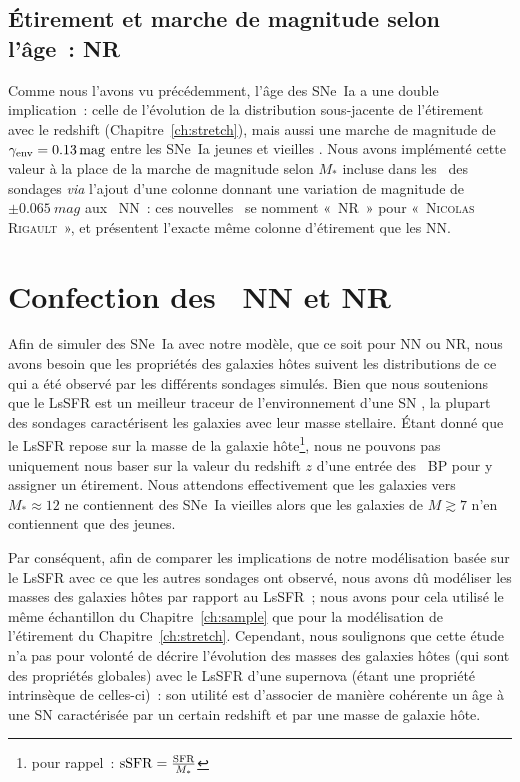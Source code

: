 \documentclass[../main/main.tex]{subfiles}
\begin{document}
\subsection{Étirement et marche de magnitude selon l'âge~: NR}\label{ssec:nr}

Comme nous l'avons vu précédemment, l'âge des SNe~Ia a une double implication~:
celle de l'évolution de la distribution sous-jacente de l'étirement avec le
redshift (Chapitre~\ref{ch:stretch}), mais aussi une marche de magnitude de
$\gamma_{\rm env} = \SI{0,13}{mag}$ entre les SNe~Ia jeunes et vieilles
\citep[Chapitre~\ref{ch:stretch},][]{rigault2020}. Nous avons implémenté cette
valeur à la place de la marche de magnitude selon $M_*$ incluse dans les
\wgtmap\ des sondages \textit{via} l'ajout d'une colonne donnant une variation
de magnitude de $\pm\SI{0.065}{mag}$ aux \hostlib\ NN~: ces nouvelles \hostlib\
se nomment «~NR~» pour «~\textsc{Nicolas} \textsc{Rigault}~», et présentent
l'exacte même colonne d'étirement que les NN.

\section{Confection des \hostlib\ NN et NR}\label{sec:hmake}

Afin de simuler des SNe~Ia avec notre modèle, que ce soit pour NN ou NR, nous
avons besoin que les propriétés des galaxies hôtes suivent les distributions de
ce qui a été observé par les différents sondages simulés. Bien que nous
soutenions que le LsSFR est un meilleur traceur de l'environnement d'une SN
\citep{briday2022}, la plupart des sondages caractérisent les galaxies avec leur
masse stellaire. Étant donné que le LsSFR repose sur la masse de la galaxie
hôte\footnote{pour rappel~: $\mathrm{sSFR} = \frac{\rm SFR}{M_*}$}, nous ne
pouvons pas uniquement nous baser sur la valeur du redshift $z$ d'une entrée des
\hostlib\ BP pour y assigner un étirement. Nous attendons effectivement que les
galaxies vers $M_*\approx12$ ne contiennent des SNe~Ia vieilles  alors que les
galaxies de $M \gtrsim 7$ n'en contiennent que des jeunes.

Par conséquent, afin de comparer les implications de notre modélisation basée
sur le LsSFR avec ce que les autres sondages ont observé, nous avons dû
modéliser les masses des galaxies hôtes par rapport au LsSFR~; nous avons pour
cela utilisé le même échantillon du Chapitre~\ref{ch:sample} que pour la
modélisation de l'étirement du Chapitre~\ref{ch:stretch}. Cependant, nous
soulignons que cette étude n'a pas pour volonté de décrire l'évolution des
masses des galaxies hôtes (qui sont des propriétés globales) avec le LsSFR d'une
supernova (étant une propriété intrinsèque de celles-ci)~: son utilité est
d'associer de manière cohérente un âge à une SN caractérisée par un certain
redshift et par une masse de galaxie hôte.
\end{document}
